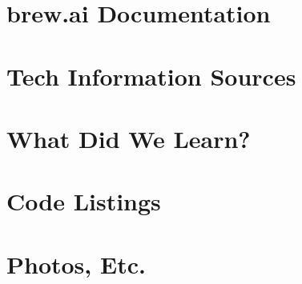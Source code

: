 \documentclass[draftclsnofoot,onecolumn,letterpaper,10pt]{IEEEtran}
\begin{document}
\section{brew.ai Documentation}
\section{Tech Information Sources}
\section{What Did We Learn?}

\appendix
\section{Code Listings}
\section{Photos, Etc.}
\end{document}
